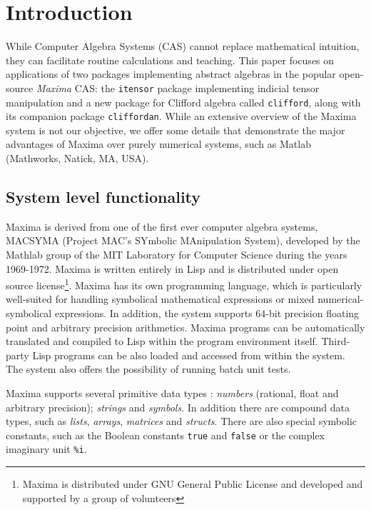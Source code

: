 \documentclass[twoside,reqno,11pt]{amsart}
\theoremstyle{definition}
\theoremstyle{remark}
\numberwithin{equation}{section}
\newcommand{\symb}[1]{{\tt #1}}
\begin{document}
\section{Introduction}
\label{sec:intro}

While Computer Algebra Systems (CAS) cannot replace mathematical intuition, they can facilitate routine calculations and teaching.
This paper focuses on applications of two packages implementing abstract algebras in the popular open-source {\em Maxima} CAS:
the \symb{itensor} package implementing indicial tensor manipulation and a new package for Clifford algebra called \symb{clifford}, along with its companion package \symb{cliffordan}.
While an extensive overview of the Maxima system is not our objective, we offer some details that demonstrate the major advantages of Maxima over purely numerical systems, such as Matlab (Mathworks, Natick, MA, USA).

\subsection{System level functionality}
\label{sec:maxintro}

Maxima is derived from one of the first ever computer algebra systems, MACSYMA (Project MAC's SYmbolic MAnipulation System),  developed by the Mathlab group of the MIT Laboratory for Computer Science during the years 1969-1972.
Maxima is written entirely in Lisp and is distributed under open source license\footnote{Maxima is distributed under GNU General Public License and developed and supported by a group of volunteers}.
Maxima has its own programming language, which is particularly well-suited for handling symbolical mathematical expressions or mixed numerical-symbolical expressions.
In addition, the system supports 64-bit precision floating point and arbitrary precision arithmetics.
Maxima programs can be automatically translated and compiled to Lisp within the program environment itself.
Third-party Lisp programs can be also loaded and accessed from within the system.
The system also offers the possibility of running batch unit tests.

Maxima supports several primitive data types \cite{M2015}:
\textit{numbers} (rational, float and arbitrary precision);
\textit{strings} and \textit{symbols}.
In addition there are compound data types, such as \textit{lists},
 \textit{arrays}, \textit{matrices} and \textit{structs}.
There are also special symbolic constants, such as the Boolean constants \symb{true} and \symb{false} or the complex imaginary unit \symb{\%i}.
\end{document}
